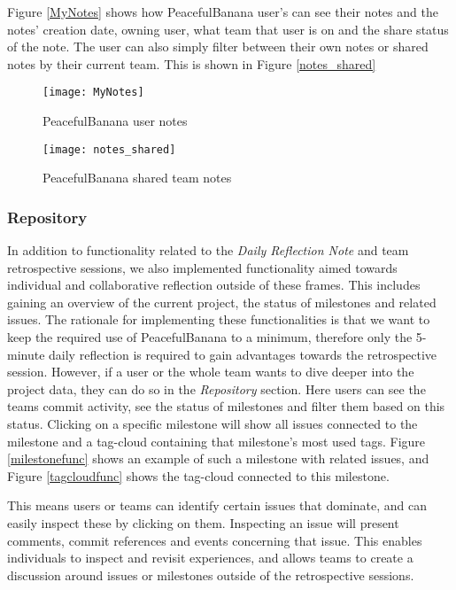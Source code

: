 Figure \ref{MyNotes} shows how PeacefulBanana user's can see their notes and the notes' creation date, owning user, what team that user is on and the share status of the note. The user can also simply filter between their own notes or shared notes by their current team. This is shown in Figure \ref{notes_shared}
\begin{figure}[H]
    \centering
        \texttt{[image: MyNotes]}
    \caption{PeacefulBanana user notes}
    \label{MyNotesFunc}
\end{figure}
\begin{figure}[H]
    \centering
        \texttt{[image: notes\_shared]}
    \caption{PeacefulBanana shared team notes}
    \label{notes_sharedfunc}
\end{figure}

\subsubsection{Repository}
In addition to functionality related to the \emph{Daily Reflection Note} and team retrospective sessions, we also implemented functionality aimed towards individual and collaborative reflection outside of these frames. This includes gaining an overview of the current project, the status of milestones and related issues. The rationale for implementing these functionalities is that we want to keep the required use of PeacefulBanana to a minimum, therefore only the 5-minute daily reflection is required to gain advantages towards the retrospective session. However, if a user or the whole team wants to dive deeper into the project data, they can do so in the \emph{Repository} section. Here users can see the teams commit activity, see the status of milestones and filter them based on this status. Clicking on a specific milestone will show all issues connected to the milestone and a tag-cloud containing that milestone's most used tags. Figure \ref{milestonefunc} shows an example of such a milestone with related issues, and Figure \ref{tagcloudfunc} shows the tag-cloud connected to this milestone. 

This means users or teams can identify certain issues that dominate, and can easily inspect these by clicking on them. Inspecting an issue will present comments, commit references and events concerning that issue. This enables individuals to inspect and revisit experiences, and allows teams to create a discussion around issues or milestones outside of the retrospective sessions. 

